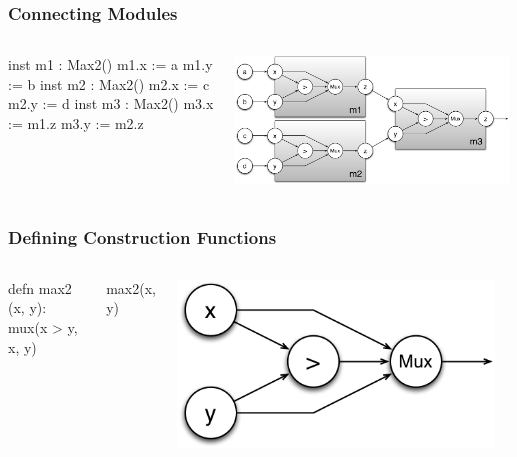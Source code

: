 \documentclass[xcolor=pdflatex,dvipsnames,table]{beamer}
\begin{document}
\begin{frame}[fragile]
\frametitle{Connecting Modules}

\begin{columns}
\begin{stanza}
inst m1 : Max2()
m1.x := a
m1.y := b
inst m2 : Max2()
m2.x := c
m2.y := d
inst m3 : Max2()
m3.x := m1.z
m3.y := m2.z
\end{stanza}


\begin{center}
\includegraphics[width=0.99\textwidth]{figs/Max4.pdf} \\
\end{center}
\end{columns}

\end{frame}


\begin{frame}[fragile]
\frametitle{Defining Construction Functions}

\begin{columns}


\begin{stanza}
defn max2 (x, y): mux(x > y, x, y)
\end{stanza}
\begin{stanza}
max2(x, y)
\end{stanza}


\begin{center}
\includegraphics[width=0.95\textwidth]{figs/Max2.pdf} \\[1cm]
\end{center}

\end{columns}

\end{frame}
\end{document}
